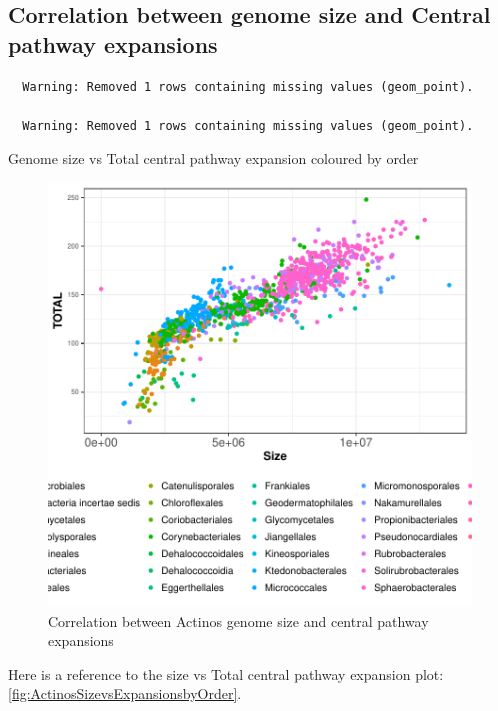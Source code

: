 \documentclass[12pt,twoside]{reedthesis}
\begin{document}
  \subsection{Correlation between genome size and Central pathway
  expansions}\label{correlation-between-genome-size-and-central-pathway-expansions-1}
  
  \begin{verbatim}
  Warning: Removed 1 rows containing missing values (geom_point).
  
  Warning: Removed 1 rows containing missing values (geom_point).
  \end{verbatim}
  
  Genome size vs Total central pathway expansion coloured by order
  
  \begin{figure}[h!tbp]
  \centering
  \includegraphics[angle = 0,scale = 1]{chapter2/Actinobacteria/ActinosSizevsExpansionsbyOrder.pdf}
  \caption[Correlation between Actinos genome size and central pathway expansions ]{\normalsize{Correlation between Actinos genome size and central pathway expansions }}
  \label{fig:ActinosSizevsExpansionsbyOrder}
  \end{figure}
  
  Here is a reference to the size vs Total central pathway expansion plot:
  \autoref{fig:ActinosSizevsExpansionsbyOrder}. \clearpage 
  
\end{document}
